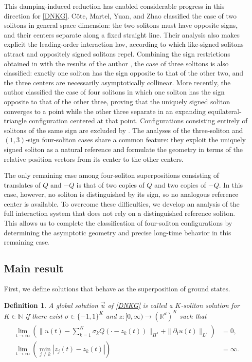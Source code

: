 \documentclass[10pt,a4paper]{amsart}
\newtheorem{definition}{Definition}[section]
\numberwithin{equation}{section}
\begin{document}
This damping-induced reduction has enabled considerable progress in this direction for \eqref{DNKG}. C\^{o}te, Martel, Yuan, and Zhao \cite{CMYZ} classified the case of two solitons in general space dimension: the two solitons must have opposite signs, and their centers separate along a fixed straight line. Their analysis also makes explicit the leading-order interaction law, according to which like-signed solitons attract and oppositely signed solitons repel. Combining the sign restrictions obtained in \cite{CD} with the results of the author \cite{I2}, the case of three solitons is also classified: exactly one soliton has the sign opposite to that of the other two, and the three centers are necessarily asymptotically collinear. More recently, the author \cite{I3} classified the case of four solitons in which one soliton has the sign opposite to that of the other three, proving that the uniquely signed soliton converges to a point while the other three separate in an expanding equilateral-triangle configuration centered at that point. Configurations consisting entirely of solitons of the same sign are excluded by \cite{CD}. The analyses of the three-soliton and $(1,3)$-sign four-soliton cases share a common feature: they exploit the uniquely signed soliton as a natural reference and formulate the geometry in terms of the relative position vectors from its center to the other centers.


The only remaining case among four-soliton superpositions consisting of translates of $Q$ and $-Q$ is that of two copies of $Q$ and two copies of $-Q$. In this case, however, no soliton is distinguished by its sign, so no analogous reference center is available. To overcome these difficulties, we develop an analysis of the full interaction system that does not rely on a distinguished reference soliton. This allows us to complete the classification of four-soliton configurations by determining the asymptotic geometry and precise long-time behavior in this remaining case.



\subsection{Main result}
First, we define solutions that behave as the superposition of ground states.
\begin{definition}\label{defKsoli}
A global solution $\vec{u}$ of \eqref{DNKG} is called a \textit{$K$-soliton solution} for $K\in\mathbb{N}$ if there exist $\sigma \in \{-1,1\}^K$ and $z:[0,\infty)\to (\mathbb{R}^d)^K$ such that 
\begin{align}
\label{Ksoli}
\begin{aligned}
\lim_{t\to \infty} \left(\|u(t)-\sum_{k=1}^K\sigma_k Q(\cdot-z_k(t))\|_{H^1}+\|{\partial}_tu(t)\|_{L^2}\right)&=0,
\\
\lim_{t\to\infty}\left( \min_{j\neq k}|z_j(t)-z_k(t)|\right)&=\infty.
\end{aligned}
\end{align}
\end{definition}
\end{document}
